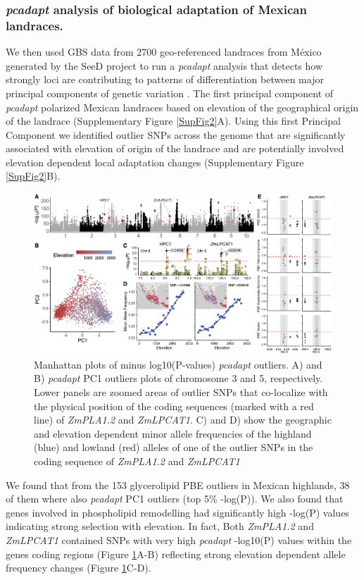 \documentclass[9pt,twocolumn,twoside]{BioRxiv}
\begin{document}
\subsubsection{\textit{pcadapt} analysis of biological adaptation of Mexican landraces.} 
We then used GBS data from 2700 geo-referenced landraces from México generated by the SeeD project \cite{Romero_Navarro2017-cn, Gates2019-xu} to run a \textit{pcadapt} analysis that detects how strongly loci are contributing to patterns of differentiation between major principal components of genetic variation \cite{Luu2017-ws}.
The first principal component of \textit{pcadapt} polarized Mexican landraces based on elevation of the geographical origin of the landrace (Supplementary Figure \ref{SupFig2}A).
Using this first Principal Component we identified outlier SNPs across the genome that are significantly associated with elevation of origin of the landrace and are potentially involved elevation dependent local adaptation changes (Supplementary Figure \ref{SupFig2}B). 
\begin{figure}[h]
\begin{center}
\includegraphics[width=0.4\paperwidth]{Figures/Fig_2.png}
\caption{Manhattan plots of minus log10(P‐values) \textit{pcadapt} outliers. A) and B) \textit{pcadapt} PC1 outliers plots of chromosome 3 and 5, respectively. 
Lower panels are zoomed areas of outlier SNPs that co-localize with the physical position of the coding sequences (marked with a red line) of \textit{ZmPLA1.2} and \textit{ZmLPCAT1}. C) and D) show the geographic and elevation dependent minor allele frequencies of the highland (blue) and lowland (red) alleles of one of the outlier SNPs in the coding sequence of \textit{ZmPLA1.2} and \textit{ZmLPCAT1}}
\label{Fig2}
\end{center}
\end{figure} 
We found that from the 153 glycerolipid PBE outliers in Mexican highlands, 38 of them where also \textit{pcadapt} PC1 outliers (top 5\% -log(P)).
We also found that genes involved in phospholipid remodelling had significantly high -log(P) values indicating strong selection with elevation. 
In fact, Both \textit{ZmPLA1.2} and \textit{ZmLPCAT1} contained SNPs with very high \textit{pcadapt} -log10(P) values within the genes coding regions (Figure \ref{Fig2}A-B) reflecting strong elevation dependent allele frequency changes  (Figure \ref{Fig2}C-D).
\end{document}

